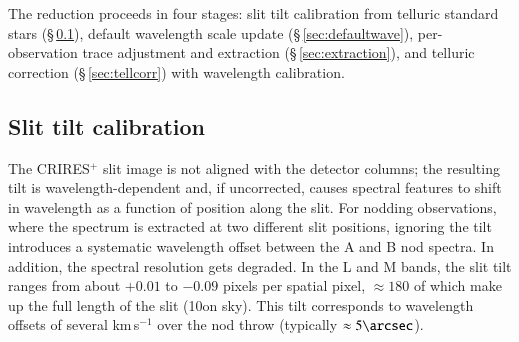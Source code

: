 \documentclass{aa}
\newcommand{\crires}{CRIRES$^+$}
\newcommand{\kms}{km\,s$^{-1}$}
\begin{document}
The reduction proceeds in four stages: slit tilt calibration from
telluric standard stars (\S\,\ref{sec:tilt}), default wavelength scale
update (\S\,\ref{sec:defaultwave}), per-observation trace adjustment and
extraction (\S\,\ref{sec:extraction}), and telluric correction
(\S\,\ref{sec:tellcorr}) with wavelength calibration.


\subsection{Slit tilt calibration}
\label{sec:tilt}

The \crires{} slit image is not aligned with the detector columns;
the resulting tilt is wavelength-dependent and, if uncorrected, causes
spectral features to shift in wavelength as a function of position along
the slit. For nodding observations, where the spectrum is extracted at
two different slit positions, ignoring the tilt introduces a systematic wavelength
offset between the A and B nod spectra. In addition, the spectral resolution
gets degraded.
In the L and M bands, the slit
tilt ranges from about $+0.01$ to $-0.09$ pixels per spatial pixel, $\approx 180$ of
which make up the full length of the slit (10\arcsec on sky). This tilt corresponds
to wavelength offsets of several \kms{} over the nod throw (typically $\approx 5\arcsec$).
\end{document}
